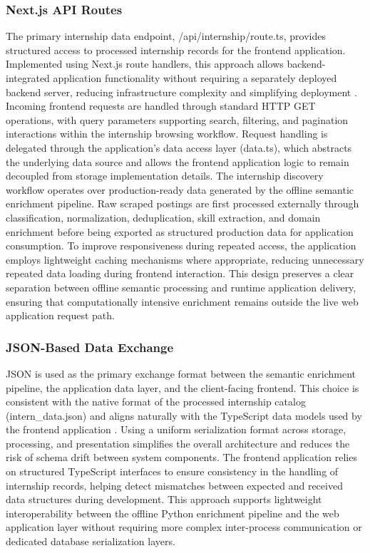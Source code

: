 \subsubsection*{Next.js API Routes}
The primary internship data endpoint, /api/internship/route.ts, provides structured access to processed internship records for the frontend application. Implemented using Next.js route handlers, this approach allows backend-integrated application functionality without requiring a separately deployed backend server, reducing infrastructure complexity and simplifying deployment \cite{fielding2002principled, riva2022realworld}.
Incoming frontend requests are handled through standard HTTP GET operations, with query parameters supporting search, filtering, and pagination interactions within the internship browsing workflow. Request handling is delegated through the application's data access layer (data.ts), which abstracts the underlying data source and allows the frontend application logic to remain decoupled from storage implementation details.
The internship discovery workflow operates over production-ready data generated by the offline semantic enrichment pipeline. Raw scraped postings are first processed externally through classification, normalization, deduplication, skill extraction, and domain enrichment before being exported as structured production data for application consumption.
To improve responsiveness during repeated access, the application employs lightweight caching mechanisms where appropriate, reducing unnecessary repeated data loading during frontend interaction.
This design preserves a clear separation between offline semantic processing and runtime application delivery, ensuring that computationally intensive enrichment remains outside the live web application request path.

\subsubsection*{JSON-Based Data Exchange}
JSON is used as the primary exchange format between the semantic enrichment pipeline, the application data layer, and the client-facing frontend. This choice is consistent with the native format of the processed internship catalog (intern\_data.json) and aligns naturally with the TypeScript data models used by the frontend application \cite{kleppmann2017designing, doan2012principles}.
Using a uniform serialization format across storage, processing, and presentation simplifies the overall architecture and reduces the risk of schema drift between system components. The frontend application relies on structured TypeScript interfaces to ensure consistency in the handling of internship records, helping detect mismatches between expected and received data structures during development.
This approach supports lightweight interoperability between the offline Python enrichment pipeline and the web application layer without requiring more complex inter-process communication or dedicated database serialization layers.
